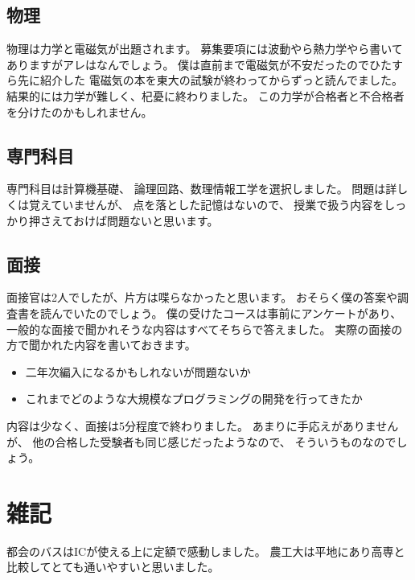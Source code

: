 \documentclass[]{jsarticle}
\begin{document}
    \subsection*{物理}
        物理は力学と電磁気が出題されます。
        募集要項には波動やら熱力学やら書いてありますがアレはなんでしょう。
        僕は直前まで電磁気が不安だったのでひたすら先に紹介した
        電磁気の本を東大の試験が終わってからずっと読んでました。
        結果的には力学が難しく、杞憂に終わりました。
        この力学が合格者と不合格者を分けたのかもしれません。
    \subsection*{専門科目}
        専門科目は計算機基礎、
        論理回路、数理情報工学を選択しました。
        問題は詳しくは覚えていませんが、
        点を落とした記憶はないので、
        授業で扱う内容をしっかり押さえておけば問題ないと思います。
    \subsection*{面接}
        面接官は2人でしたが、片方は喋らなかったと思います。
        おそらく僕の答案や調査書を読んでいたのでしょう。
        僕の受けたコースは事前にアンケートがあり、
        一般的な面接で聞かれそうな内容はすべてそちらで答えました。
        実際の面接の方で聞かれた内容を書いておきます。
        \begin{itemize}
            \item 二年次編入になるかもしれないが問題ないか
            \item これまでどのような大規模なプログラミングの開発を行ってきたか
        \end{itemize}
        内容は少なく、面接は5分程度で終わりました。
        あまりに手応えがありませんが、
        他の合格した受験者も同じ感じだったようなので、
        そういうものなのでしょう。
\section*{雑記}
    都会のバスはICが使える上に定額で感動しました。
    農工大は平地にあり高専と比較してとても通いやすいと思いました。
\end{document}

